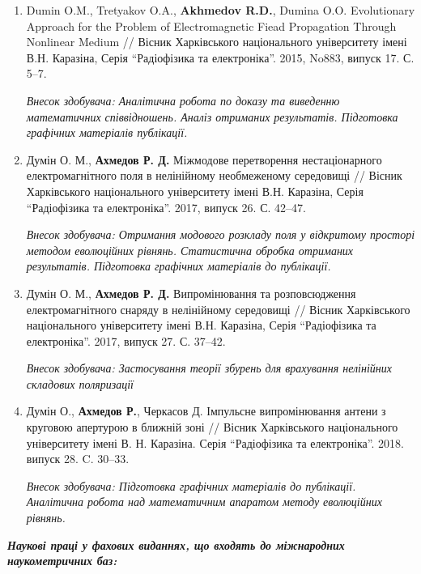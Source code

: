 \begin{enumerate}

\item Dumin O.M., Tretyakov O.A., \textbf{Akhmedov R.D.}, Dumina O.O. 
Evolutionary Approach for the Problem of Electromagnetic Fiead 
Propagation Through Nonlinear Medium // Вісник Харківського національного 
університету імені В.Н. Каразіна, Серія ``Радіофізика та електроніка''. 
2015, No883, випуск 17. С. 5--7.

\textit{Внесок здобувача: Аналітична робота по доказу та виведенню 
математичних співвідношень. Аналіз отриманих результатів. Підготовка 
графічних матеріалів публікації.}

\item Думін О. М., \textbf{Ахмедов Р. Д.} Міжмодове перетворення нестаціонарного 
електромагнітного поля в нелінійному необмеженому середовищі // Вісник 
Харківського національного університету імені В.Н. Каразіна, Серія 
``Радіофізика та електроніка''. 2017, випуск 26. С. 42--47.

\textit{Внесок здобувача: Отримання модового розкладу поля у відкритому 
просторі методом еволюційних рівнянь. Статистична обробка отриманих результатів.
Підготовка графічних матеріалів до публікації. }

\item Думін О. М., \textbf{Ахмедов Р. Д.} Випромінювання та розповсюдження 
електромагнітного снаряду в нелінійному середовищі // Вісник 
Харківського національного університету імені В.Н. Каразіна, Серія 
``Радіофізика та електроніка''. 2017, випуск 27. С. 37--42.

\textit{Внесок здобувача: Застосування теорії збурень для врахування 
нелінійних складових поляризації}

\item Думін О., \textbf{Ахмедов Р.}, Черкасов Д. Імпульсне випромінювання 
антени з круговою апертурою в ближній зоні // Вісник Харківського 
національного університету імені В. Н. Каразіна. Серія ``Радіофізика та 
електроніка''. 2018. випуск 28. C. 30--33.

\textit{Внесок здобувача: Підготовка графічних матеріалів до публікації. 
Аналітична робота над математичним апаратом методу еволюційних рівнянь.}

\setcounter{ItemsInMyWriting}{\value{enumi}}
\end{enumerate}

\begin{center} 
\textit{\textbf{Наукові праці у фахових виданнях, що входять до 
міжнародних наукометричних баз:}}
\end{center}

